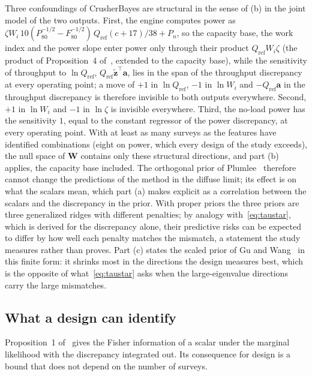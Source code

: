 Three confoundings of CrusherBayes are structural in the sense of (b) in the joint model of the two outputs. First, the
engine computes power as $\zeta W_i\,10(P_{80}^{-1/2}-F_{80}^{-1/2})\,Q_{\mathrm{ref}}(c+17)/38+P_n$, so the capacity base,
the work index and the power slope enter power only through their product $Q_{\mathrm{ref}}W_i\zeta$ (the product of
Proposition~4 of~\cite{cb002}, extended to the capacity base), while the sensitivity of throughput to $\ln Q_{\mathrm{ref}}$,
$Q_{\mathrm{ref}}\tilde{\mathbf z}^{\top}\mathbf a$, lies in the span of the throughput discrepancy at every operating point;
a move of $+1$ in $\ln Q_{\mathrm{ref}}$, $-1$ in $\ln W_i$ and $-Q_{\mathrm{ref}}\mathbf a$ in the throughput discrepancy is
therefore invisible to both outputs everywhere. Second, $+1$ in $\ln W_i$ and $-1$ in $\ln\zeta$ is invisible everywhere.
Third, the no-load power has the sensitivity $1$, equal to the constant regressor of the power discrepancy, at every
operating point. With at least as many surveys as the features have identified combinations (eight on power, which every
design of the study exceeds), the null space of $\mathbf W$ contains only these structural directions, and part (b) applies,
the capacity base included. The orthogonal prior of Plumlee~\cite{plumlee} therefore cannot change the predictions of the
method in the diffuse limit; its effect is on what the scalars mean, which part (a) makes explicit as a correlation between
the scalars and the discrepancy in the prior. With proper priors the three priors are three generalized ridges with different
penalties; by analogy with~\eqref{eq:taustar}, which is derived for the discrepancy alone, their predictive risks can be
expected to differ by how well each penalty matches the mismatch, a statement the study measures rather than proves. Part (c) states the scaled prior of
Gu and Wang~\cite{guwang} in this finite form: it shrinks most in the directions the design measures best, which is the
opposite of what~\eqref{eq:taustar} asks when the large-eigenvalue directions carry the large mismatches.

\subsection{What a design can identify}

Proposition~1 of~\cite{cb002} gives the Fisher information of a scalar under the marginal likelihood with the discrepancy
integrated out. Its consequence for design is a bound that does not depend on the number of surveys.


